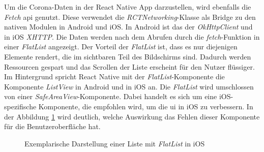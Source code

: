 Um die Corona-Daten in der React Native App darzustellen, wird ebenfalls die \textit{Fetch} \ac{api} genutzt.
Diese verwendet die \textit{RCTNetworking}-Klasse als Bridge zu den nativen Modulen in Android und iOS.
In Android ist das der \textit{OkHttpClient} und in iOS \textit{XHTTP}.
Die Daten werden nach dem Abrufen durch die \textit{fetch}-Funktion in einer \textit{FlatList} angezeigt.
Der Vorteil der \textit{FlatList} ist, dass es nur diejenigen Elemente rendert, die im sichtbaren Teil des Bildschirms sind.
Dadurch werden Ressourcen gespart und das Scrollen der Liste erscheint für den Nutzer flüssiger.
Im Hintergrund spricht React Native mit der \textit{FlatList}-Komponente die Komponente \textit{ListView} in Android und in iOS an.
Die \textit{FlatList} wird umschlossen von einer \textit{SafeAreaView}-Komponente.
Dabei handelt es sich um eine iOS-spezifische Komponente, die empfohlen wird, um die \ac{ui} in iOS zu verbessern.
In der Abbildung \ref{fig:flatlist:ios} wird deutlich, welche Auswirkung das Fehlen dieser Komponente für die Benutzeroberfläche hat.

\begin{figure}
\caption{Exemplarische Darstellung einer Liste mit \textit{FlatList} in iOS}
\label{fig:flatlist:ios}
\end{figure}

